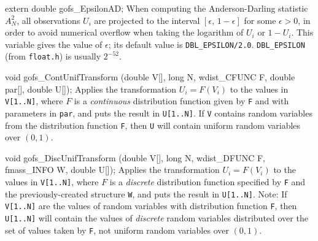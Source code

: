 extern double gofs_EpsilonAD;
\endcode
 \tab When computing the Anderson-Darling statistic $A_N^2$, 
  all observations $U_i$ are projected to the interval 
  $[\epsilon,\,1-\epsilon]$ for some $\epsilon > 0$, in order to 
  avoid numerical overflow when taking the logarithm of $U_i$ or
  $1-U_i$.  This variable gives the value of $\epsilon$;
  its default value is {\tt DBL\_EPSILON/2.0}.
  {\tt DBL\_EPSILON} (from {\tt float.h}) is usually $2^{-52}$.
 \endtab
\fi %




\code

void gofs_ContUnifTransform (double V[], long N, wdist_CFUNC F,
                             double par[], double U[]);
\endcode
\tab  Applies the transformation $U_i = F(V_i)$ to the values in
  {\tt V[1..N]}, where $F$ is a {\em continuous\/} distribution function 
  given by {\tt F} and with parameters in {\tt par},
  and puts the result in {\tt U[1..N]}.
  If {\tt V} contains random variables from the distribution function
  {\tt F}, then {\tt U} will contain uniform random variables over $(0,1)$.
\endtab
\code


void gofs_DiscUnifTransform (double V[], long N, wdist_DFUNC F,
                             fmass_INFO W, double U[]);
\endcode
\tab  Applies the transformation $U_i = F(V_i)$ to the values in
  {\tt V[1..N]}, where $F$ is a {\em discrete\/} distribution function 
  specified by {\tt F} and the previously-created structure {\tt W},
  and puts the result in {\tt U[1..N]}.
  Note: If {\tt V[1..N]} are the values of random variables with
  distribution function {\tt F}, then {\tt U[1..N]} will contain 
  the values of {\em discrete\/} random variables distributed over the
  set of values taken by {\tt F}, 
  not uniform random variables over $(0,1)$.
\endtab
\code


